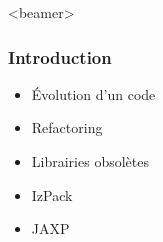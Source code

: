 \begin{frame}<beamer>
\frametitle{Introduction}
\begin{itemize}
	\item Évolution d'un code
	\item Refactoring
	\item Librairies obsolètes
\end{itemize}
\begin{itemize}
	\item IzPack
	\item JAXP
\end{itemize}
\end{frame}



